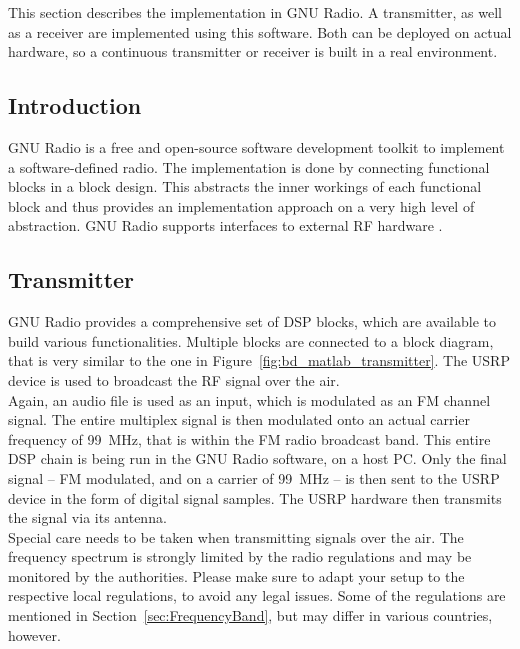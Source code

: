 This section describes the implementation in GNU Radio.
A transmitter, as well as a receiver are implemented using this software.
Both can be deployed on actual hardware, so a continuous transmitter or receiver is built in a real environment.

\subsection{Introduction}

GNU Radio is a free and open-source software development toolkit to implement a software-defined radio.
The implementation is done by connecting functional blocks in a block design.
This abstracts the inner workings of each functional block and thus provides an implementation approach on a very high level of abstraction.
GNU Radio supports interfaces to external RF hardware \cite{SoftwareGnuRadio}.

\subsection{Transmitter}

GNU Radio provides a comprehensive set of DSP blocks, which are available to build various functionalities.
Multiple blocks are connected to a block diagram, that is very similar to the one in Figure~\ref{fig:bd_matlab_transmitter}.
The USRP device is used to broadcast the RF signal over the air.\\

Again, an audio file is used as an input, which is modulated as an FM channel signal.
The entire multiplex signal is then modulated onto an actual carrier frequency of 99~MHz, that is within the FM radio broadcast band.
This entire DSP chain is being run in the GNU Radio software, on a host PC.
Only the final signal -- FM modulated, and on a carrier of 99~MHz -- is then sent to the USRP device in the form of digital signal samples.
The USRP hardware then transmits the signal via its antenna.\\

Special care needs to be taken when transmitting signals over the air.
The frequency spectrum is strongly limited by the radio regulations and may be monitored by the authorities.
Please make sure to adapt your setup to the respective local regulations, to avoid any legal issues.
Some of the regulations are mentioned in Section~\ref{sec:FrequencyBand}, but may differ in various countries, however.\\

